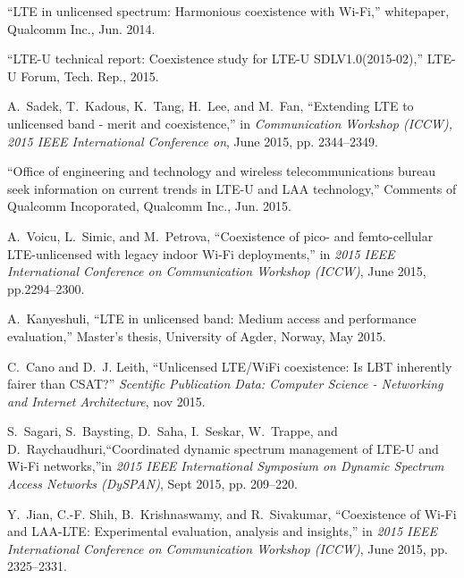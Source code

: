 \begin{thebibliography}{99.}
 ``{LTE} in unlicensed spectrum: Harmonious coexistence with {Wi-Fi},'' whitepaper, Qualcomm Inc., Jun. 2014.

 ``{LTE-U} technical report: Coexistence study for {LTE-U} {SDLV1.0(2015-02)},'' LTE-U Forum, Tech. Rep., 2015.

A.~Sadek, T.~Kadous, K.~Tang, H.~Lee, and M.~Fan, ``Extending {LTE} to unlicensed band - merit and coexistence,'' in \emph{Communication Workshop (ICCW), 2015 IEEE International Conference on}, June 2015, pp. 2344--2349.

``Office of engineering and technology and wireless telecommunications bureau seek information on current trends in {LTE-U} and {LAA} technology,''
Comments of Qualcomm Incoporated, Qualcomm Inc., Jun. 2015.

 A.~Voicu, L.~Simic, and M.~Petrova, ``Coexistence of pico- and femto-cellular {LTE}-unlicensed with legacy indoor {Wi-Fi} deployments,'' in \emph{2015 IEEE
	International Conference on Communication Workshop (ICCW)}, June 2015, pp.2294--2300.

A.~Kanyeshuli, ``{LTE} in unlicensed band: Medium access and performance evaluation,'' Master's thesis, University of Agder, Norway, May 2015.

C.~Cano and D.~J. Leith, ``Unlicensed {LTE}/{WiFi} coexistence: Is {LBT} inherently fairer than {CSAT}?'' \emph{Scentific Publication Data: Computer
	Science - Networking and Internet Architecture}, nov 2015.

S.~Sagari, S.~Baysting, D.~Saha, I.~Seskar, W.~Trappe, and D.~Raychaudhuri,``Coordinated dynamic spectrum management of {LTE-U} and {Wi-Fi} networks,''in \emph{2015 IEEE International Symposium on Dynamic Spectrum Access Networks (DySPAN)}, Sept 2015, pp. 209--220.

Y.~Jian, C.-F. Shih, B.~Krishnaswamy, and R.~Sivakumar, ``Coexistence of {Wi-Fi} and {LAA-LTE}: Experimental evaluation, analysis and insights,'' in
\emph{2015 IEEE International Conference on Communication Workshop (ICCW)}, June 2015, pp. 2325--2331.
\end{thebibliography}
